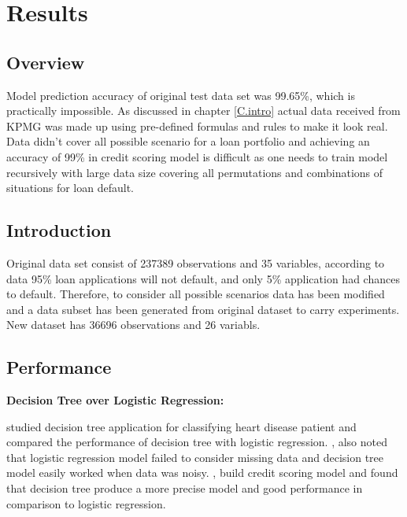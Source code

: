%
%
%
%

\chapter{Results}\label{C.Results}

\section{Overview}
Model prediction accuracy of original test data set was 99.65\%, which is practically impossible. As discussed in chapter \ref{C.intro} actual data received from KPMG was made up using pre-defined formulas and rules to make it look real. Data didn't cover all possible scenario for a loan portfolio and achieving an accuracy of 99\% in credit scoring model is difficult as one needs to train model recursively with large data size covering all permutations and combinations of situations for loan default.


\section{Introduction}\label{S.intro5}

Original data set consist of 237389 observations and 35 variables, according to data 95\% loan applications will not default, and only 5\% application had chances to default. Therefore, to consider all possible scenarios data has been modified and a data subset has been generated from original dataset to carry experiments. New dataset has 36696 observations and 26 variabls. 

\section{Performance}
\textbf{Decision Tree over Logistic Regression:}

\cite{long1993comparison} studied decision tree application for classifying heart disease patient and compared the performance of decision tree with logistic regression. \cite{long1993comparison}, also noted that logistic regression model failed to consider missing data and decision tree model easily worked when data was noisy. \cite{satchidananda2006comparing}, build credit scoring model and found that decision tree produce a more precise model and good performance in comparison to logistic regression.


